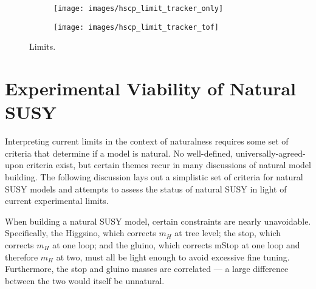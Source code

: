 \documentclass[12pt]{article}
\begin{document}
        \noindent \begin{figure}[htbp] \begin{center}
        \begin{subfigure}[htbp]{0.45\textwidth} \begin{center}
        \texttt{[image: images/hscp\_limit\_tracker\_only]}
        \end{center} \end{subfigure}
        \begin{subfigure}[htbp]{0.45\textwidth} \begin{center}
        \texttt{[image: images/hscp\_limit\_tracker\_tof]}
        \end{center} \end{subfigure}
        \caption{Limits.}
        \label{hscp_limits}
        \end{center} \end{figure}

\section{Experimental Viability of Natural SUSY}
    
    Interpreting current limits in the context of naturalness requires some set of criteria that determine if a model is natural. No well-defined, universally-agreed-upon criteria exist, but certain themes recur in many discussions of natural model building. The following discussion lays out a simplistic set of criteria for natural SUSY models and attempts to assess the status of natural SUSY in light of current experimental limits.
    
    When building a natural SUSY model, certain constraints are nearly unavoidable. Specifically, the Higgsino, which corrects $m_H$ at tree level; the stop, which corrects $m_H$ at one loop; and the gluino, which corrects mStop at one loop and therefore $m_H$ at two, must all be light enough to avoid excessive fine tuning. Furthermore, the stop and gluino masses are correlated --- a large difference between the two would itself be unnatural.
\end{document}
